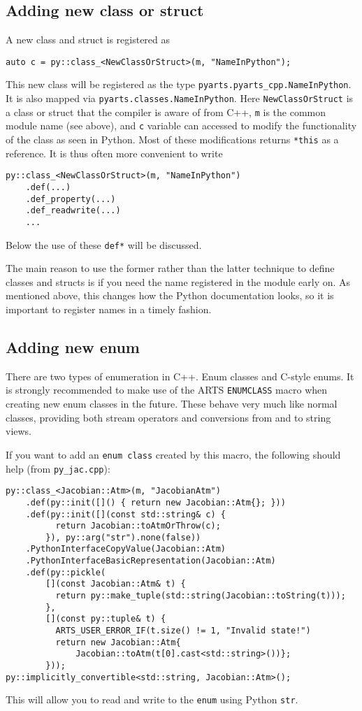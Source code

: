 \subsection{Adding new class or struct \label{subsec: new class}}
A new class and struct is registered as
\begin{verbatim}
auto c = py::class_<NewClassOrStruct>(m, "NameInPython");
\end{verbatim}

This new class will be registered as the type \texttt{pyarts.pyarts_cpp.NameInPython}.  It is also mapped via \texttt{pyarts.classes.NameInPython}.
Here \texttt{NewClassOrStruct} is a class or struct that the compiler is aware of from C++, \texttt{m} is the common module name (see above), and
\texttt{c} variable can accessed to modify the functionality of the class as seen in Python.  Most of these modifications returns \texttt{*this} as 
a reference.  It is thus often more convenient to write
\begin{verbatim}
py::class_<NewClassOrStruct>(m, "NameInPython")
    .def(...)
    .def_property(...)
    .def_readwrite(...)
    ...
\end{verbatim}
Below the use of these \texttt{def*} will be discussed.

The main reason to use the former rather than the latter technique to define classes and structs is if you need the name
registered in the module early on.  As mentioned above, this changes how the Python documentation looks, so it is important
to register names in a timely fashion.

\subsection{Adding new enum}
There are two types of enumeration in C++.  Enum classes and C-style enums.  It is strongly recommended to make use of the
ARTS \texttt{ENUMCLASS} macro when creating new enum classes in the future.  These behave very much like normal classes,
providing both stream operators and conversions from and to string views.

If you want to add an \texttt{enum class} created by this macro, the following
should help (from \verb|py_jac.cpp|):
\begin{verbatim}
py::class_<Jacobian::Atm>(m, "JacobianAtm")
    .def(py::init([]() { return new Jacobian::Atm{}; }))
    .def(py::init([](const std::string& c) { 
          return Jacobian::toAtmOrThrow(c); 
        }), py::arg("str").none(false))
    .PythonInterfaceCopyValue(Jacobian::Atm)
    .PythonInterfaceBasicRepresentation(Jacobian::Atm)
    .def(py::pickle(
        [](const Jacobian::Atm& t) {
          return py::make_tuple(std::string(Jacobian::toString(t)));
        },
        [](const py::tuple& t) {
          ARTS_USER_ERROR_IF(t.size() != 1, "Invalid state!")
          return new Jacobian::Atm{
              Jacobian::toAtm(t[0].cast<std::string>())};
        }));
py::implicitly_convertible<std::string, Jacobian::Atm>();
\end{verbatim}
This will allow you to read and write to the \texttt{enum} using Python \texttt{str}.

